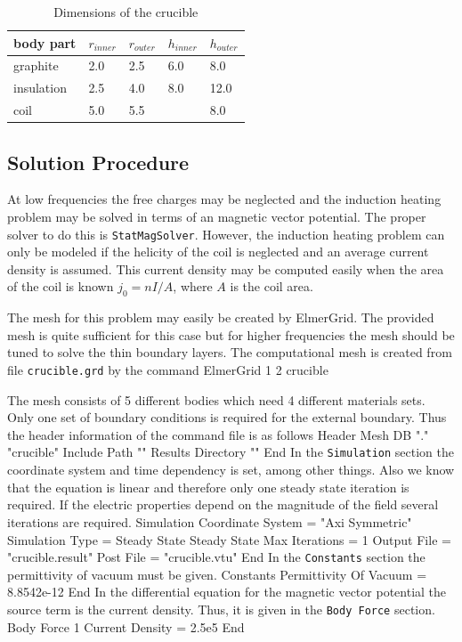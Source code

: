 \begin{table}
\caption{Dimensions of the crucible}
\label{tab:ind_heat2}
\begin{center}
\begin{tabular}{lllll} \hline
body part &  $r_{inner}$ & $r_{outer}$ & $h_{inner}$ & $h_{outer}$ \\ \hline
graphite  &  2.0   &  2.5 & 6.0 & 8.0 \\
insulation &  2.5   &  4.0 & 8.0 & 12.0 \\
coil      &  5.0   & 5.5  &     & 8.0  \\ \hline
\end{tabular}
\end{center}
\end{table}


\subsection*{Solution Procedure}

At low frequencies the free charges may be neglected and the 
induction heating problem may be solved in terms 
of an magnetic vector potential. The proper solver to do
this is \texttt{StatMagSolver}.
However, the induction heating problem can only be modeled if the helicity 
of the coil is neglected and an average current density is assumed.
This current density may be computed easily when the 
area of the coil is known $j_0=n I / A$, where $A$ is the 
coil area.

The mesh for this problem may easily be created by ElmerGrid.
The provided mesh is quite sufficient for this case
but for higher frequencies the mesh should be tuned 
to solve the thin boundary layers.
The computational mesh is created from file \texttt{crucible.grd} by the 
command 
\ttbegin
ElmerGrid 1 2 crucible
\ttend

The mesh consists of 5 different bodies which need 4
different materials sets. Only one set of boundary conditions
is required for the external boundary. Thus the header
information of the command file is as follows
\ttbegin
Header
  Mesh DB "." "crucible"
  Include Path ""
  Results Directory ""
End
\ttend
%
In the \texttt{Simulation} section the coordinate system and
time dependency is set, among other things. Also we know that
the equation is linear and therefore only one steady state
iteration is required. If the electric properties depend on
the magnitude of the field several iterations are required.
\ttbegin
Simulation
  Coordinate System = "Axi Symmetric"
  Simulation Type = Steady State
  Steady State Max Iterations = 1
  Output File = "crucible.result"
  Post File = "crucible.vtu"
End
\ttend
%
In the \texttt{Constants} section the permittivity of 
vacuum must be given.
\ttbegin
Constants
  Permittivity Of Vacuum = 8.8542e-12
End
\ttend
%
In the differential equation for the magnetic vector potential the 
source term is the current density. Thus, it is given in the
\texttt{Body Force} section. 
\ttbegin
Body Force 1
  Current Density = 2.5e5
End

